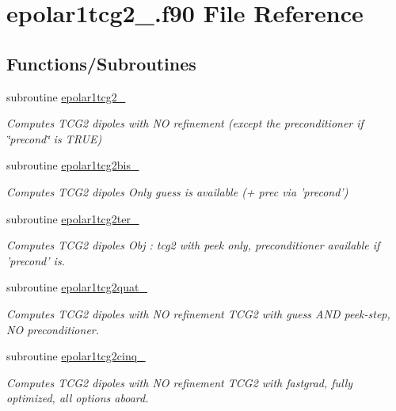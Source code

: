 \hypertarget{epolar1tcg2__2_8f90}{\section{epolar1tcg2\-\_.\-f90 File Reference}
\label{epolar1tcg2__2_8f90}
}
\subsection*{Functions/\-Subroutines}
\begin{DoxyCompactItemize}
\item 
subroutine \hyperlink{epolar1tcg2__2_8f90_ae4a858c79ec3ba3c1c6ebba03978211a}{epolar1tcg2\-\_}
\begin{DoxyCompactList}\small\item\em Computes T\-C\-G2 dipoles with N\-O refinement (except the preconditioner if \char`\"{}precond\char`\"{} is T\-R\-U\-E) \end{DoxyCompactList}\item 
subroutine \hyperlink{epolar1tcg2__2_8f90_a445cdc4ac4f10739f7a3de9c5df4a0de}{epolar1tcg2bis\-\_}
\begin{DoxyCompactList}\small\item\em Computes T\-C\-G2 dipoles Only guess is available (+ prec via 'precond') \end{DoxyCompactList}\item 
subroutine \hyperlink{epolar1tcg2__2_8f90_a73d800dcf4002045b5d0b08d50301b1b}{epolar1tcg2ter\-\_}
\begin{DoxyCompactList}\small\item\em Computes T\-C\-G2 dipoles Obj \-: tcg2 with peek only, preconditioner available if 'precond' is. \end{DoxyCompactList}\item 
subroutine \hyperlink{epolar1tcg2__2_8f90_ac14c35b41a5a0b5a30427df291e9975e}{epolar1tcg2quat\-\_}
\begin{DoxyCompactList}\small\item\em Computes T\-C\-G2 dipoles with N\-O refinement T\-C\-G2 with guess A\-N\-D peek-\/step, N\-O preconditioner. \end{DoxyCompactList}\item 
subroutine \hyperlink{epolar1tcg2__2_8f90_a63164484dbfb28c497dd47e738876749}{epolar1tcg2cinq\-\_}
\begin{DoxyCompactList}\small\item\em Computes T\-C\-G2 dipoles with N\-O refinement T\-C\-G2 with fastgrad, fully optimized, all options aboard. \end{DoxyCompactList}\end{DoxyCompactItemize}



